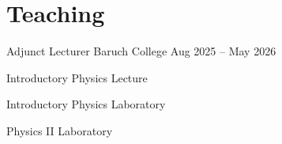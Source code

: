 \section{Teaching}

\begin{teaching}
{Adjunct Lecturer}
{Baruch College}
{Aug 2025 -- May 2026}
    \item Introductory Physics Lecture
    \item Introductory Physics Laboratory
    \item Physics II Laboratory
\end{teaching}